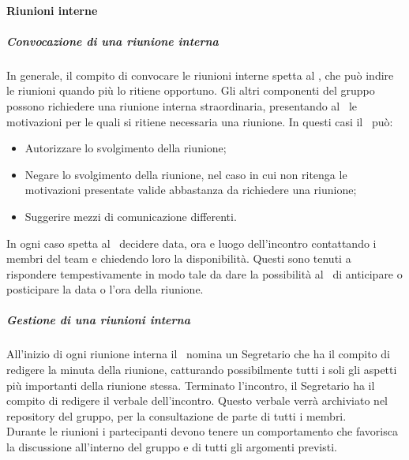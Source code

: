 \documentclass[../NormeProgetto.tex]{subfiles}
\begin{document}
			\paragraph{Riunioni interne}
			\subparagraph{Convocazione di una riunione interna}
			In generale, il compito di convocare le riunioni interne spetta al \responsabilediprogetto, che può indire le riunioni quando più lo ritiene opportuno. Gli altri componenti del gruppo possono richiedere una riunione interna straordinaria, presentando al \responsabilediprogetto\ le motivazioni per le quali si ritiene necessaria una riunione. In questi casi il \responsabilediprogetto\ può:
			\begin{itemize}
			\item Autorizzare lo svolgimento della riunione;
			\item Negare lo svolgimento della riunione, nel caso in cui non ritenga le motivazioni presentate valide abbastanza da richiedere una riunione;
			\item Suggerire mezzi di comunicazione differenti.
			\end{itemize}
			In ogni caso spetta al \responsabilediprogetto\ decidere data, ora e luogo dell'incontro contattando i membri del team e chiedendo loro la disponibilità. Questi sono tenuti a rispondere tempestivamente in modo tale da dare la possibilità al \responsabilediprogetto\ di anticipare o posticipare la data o l'ora della riunione.
			\subparagraph{Gestione di una riunioni interna}
			All'inizio di ogni riunione interna il \responsabilediprogetto\ nomina un Segretario che ha il compito di redigere la minuta della riunione, catturando possibilmente tutti i soli gli aspetti più importanti della riunione stessa. Terminato l'incontro, il Segretario ha il compito di redigere il verbale dell'incontro. Questo verbale verrà archiviato nel repository del gruppo, per la consultazione de parte di tutti i membri. \\ Durante le riunioni i partecipanti devono tenere un comportamento che favorisca la discussione all'interno del gruppo e di tutti gli argomenti previsti. 
\end{document}
